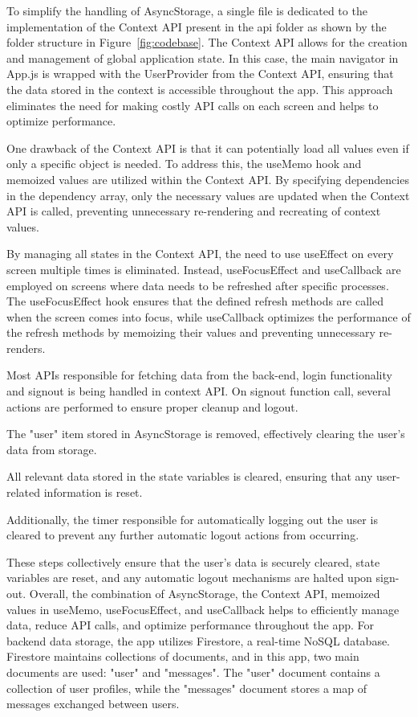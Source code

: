 To simplify the handling of AsyncStorage, a single file is dedicated to the implementation of the Context API present in the api folder as shown by the folder structure in Figure~\ref{fig:codebase}. The Context API allows for the creation and management of global application state. In this case, the main navigator in App.js is wrapped with the UserProvider from the Context API, ensuring that the data stored in the context is accessible throughout the app. This approach eliminates the need for making costly API calls on each screen and helps to optimize performance.

One drawback of the Context API is that it can potentially load all values even if only a specific object is needed. To address this, the useMemo hook and memoized values are utilized within the Context API. By specifying dependencies in the dependency array, only the necessary values are updated when the Context API is called, preventing unnecessary re-rendering and recreating of context values.

By managing all states in the Context API, the need to use useEffect on every screen multiple times is eliminated. Instead, useFocusEffect and useCallback are employed on screens where data needs to be refreshed after specific processes. The useFocusEffect hook ensures that the defined refresh methods are called when the screen comes into focus, while useCallback optimizes the performance of the refresh methods by memoizing their values and preventing unnecessary re-renders.

Most APIs responsible for fetching data from the back-end, login functionality and signout is being handled in context API. On signout function call, several actions are performed to ensure proper cleanup and logout. 
\begin{compactenum}
    \item The "user" item stored in AsyncStorage is removed, effectively clearing the user's data from storage.
    \item All relevant data stored in the state variables is cleared, ensuring that any user-related information is reset.
    \item Additionally, the timer responsible for automatically logging out the user is cleared to prevent any further automatic logout actions from occurring.
\end{compactenum}
These steps collectively ensure that the user's data is securely cleared, state variables are reset, and any automatic logout mechanisms are halted upon sign-out.
Overall, the combination of AsyncStorage, the Context API, memoized values in useMemo, useFocusEffect, and useCallback helps to efficiently manage data, reduce API calls, and optimize performance throughout the app.
\newline
For backend data storage, the app utilizes Firestore, a real-time NoSQL database. Firestore maintains collections of documents, and in this app, two main documents are used: "user" and "messages". The "user" document contains a collection of user profiles, while the "messages" document stores a map of messages exchanged between users.

